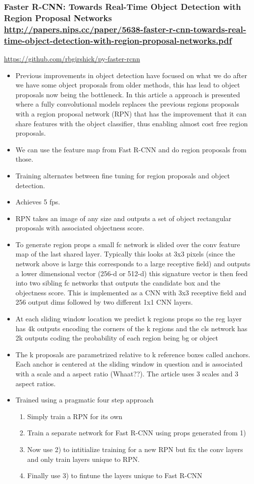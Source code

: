 \documentclass[11pt]{article}
\begin{document}
\subsubsection{Faster R-CNN: Towards Real-Time Object Detection with Region Proposal Networks \url{http://papers.nips.cc/paper/5638-faster-r-cnn-towards-real-time-object-detection-with-region-proposal-networks.pdf}}
\label{sec:org3148983}
\url{https://github.com/rbgirshick/py-faster-rcnn}
\begin{itemize}
\item Previous improvements in object detection have focused on what we do after we have some object proposals from older methods, this has lead to object proposals now being the bottleneck. In this article a approach is presented where a fully convolutional models replaces the previous regions proposals with a region proposal network (RPN) that has the improvement that it can share features with the object classifier, thus enabling almost cost free region proposals.
\item We can use the feature map from Fast R-CNN and do region proposals from those.
\item Training alternates between fine tuning for region proposals and object detection.
\item Achieves 5 fps.
\item RPN takes an image of any size and outputs a set of object rectangular proposals with associated objectness score.
\item To generate region props a small fc network is slided over the conv feature map of the last shared layer. Typically this looks at 3x3 pixels (since the network above is large this corresponds to a large receptive field) and outputs a lower dimensional vector (256-d or 512-d) this signature vector is then feed into two sibling fc networks that outputs the candidate box and the objectness score. This is implemented as a CNN with 3x3 receptive field and 256 output dims followed by two different 1x1 CNN layers.
\item At each sliding window location we predict k regions props so the reg layer has 4k outputs encoding the corners of the k regions and the cls network has 2k outputs coding the probability of each region being bg or object
\item The k proposals are parametrized relative to k reference boxes called anchors. Each anchor is centered at the sliding window in question and is associated with a scale and a aspect ratio (Whaat??). The article uses 3 scales and 3 aspect ratios.
\item Trained using a pragmatic four step approach
\begin{enumerate}
\item Simply train a RPN for its own
\item Train a separate network for Fast R-CNN using props generated from 1)
\item Now use 2) to intitialize training for a new RPN but fix the conv layers and only train layers unique to RPN.
\item Finally use 3) to fintune the layers unique to Fast R-CNN
\end{enumerate}
\end{itemize}
\end{document}
